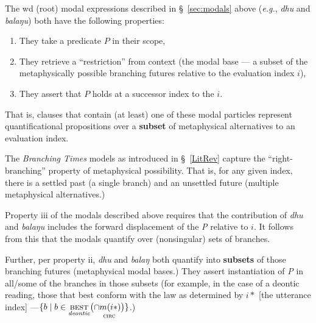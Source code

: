 The \gls{wd} (root) modal expressions described in \S~\ref{sec:modals} above (\textit{e.g.}, \textit{dhu} and \textit{balaŋu}) both have the following properties:
\begin{enumerate}[\bf\sf i]
	\item  They take a predicate $ \mathit P $ in their scope, 
	\item  They retrieve a ``restriction'' from context (the modal base --- a subset of the metaphysically possible branching futures relative to the evaluation index $ i $),
	\item They assert that $ \mathit P $ holds at a successor index to the $ i $.

\end{enumerate} That is, clauses that contain (at least) one of these modal particles represent quantificational propositions over a \textbf{subset} of metaphysical alternatives to an evaluation index.

 The \textit{Branching Times} models as introduced in \S~\ref{LitRev} capture the ``right-branching'' property of metaphysical possibility. That is, for any given index, there is a settled past (a single branch) and an unsettled future (multiple metaphysical alternatives.) 
 
 Property \textsf{iii} of the modals described above requires that the contribution of \textit{dhu} and \textit{balaŋu} includes the forward displacement of the \textit{P} relative to $ i $. It follows from this that the modals quantify over (nonsingular) sets of branches.%

 
 Further, per property \textsf{ii}, \textit{dhu} and \textit{balaŋ} both quantify into \textbf{subsets} of those branching futures (metaphysical modal bases.) They assert instantiation of \textit{P} in all/some of the branches in those subsets (for example, in the case of a deontic reading, those that best conform with the law as determined by $ i* $ [the utterance index] ---$ \{b\mid b\in \underset{\textit{deontic}}{\textsc{best}}\big(\underset{\textsc{circ}}{\cap m(i*)\big)}\} $.) 


